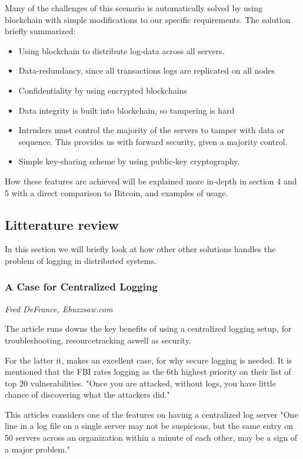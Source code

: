 Many of the challenges of this scenario is automatically solved by using blockchain with simple modifications to our specific requirements.
The solution briefly summarized:
\begin{itemize}
    \item Using blockchain to distribute log-data across all servers.
    \item Data-redundancy, since all transactions logs are replicated on all nodes
    \item Confidentiality by using encrypted blockchains
    \item Data integrity is built into blockchain, so tampering is hard
    \item Intruders must control the majority of the servers to tamper with data or sequence. This provides us with forward security, given a majority control.
    \item Simple key-sharing scheme by using public-key cryptography.
\end{itemize}

How these features are achieved will be explained more in-depth in section 4 and 5 with a direct comparison to Bitcoin, and examples of usage.

\subsection{Litterature review}
In this section we will briefly look at how other other solutions handles the problem of logging in distributed systems.
\subsubsection{A Case for Centralized Logging }
\vspace{-3mm}
{\footnotesize \it Fred DeFrance, Ebuzzsaw.com}~\cite{defrance}

The article runs downs the key benefits of using a centralized logging
setup, for troubleshooting, resourcetracking aswell as security.

For the latter it, makes an excellent case, for why secure logging is
needed. It is mentioned that the FBI rates logging as the 6th highest
priority on their list of top 20 vulnerabilities. "Once you are
attacked, without logs, you have little chance of discovering what the
attackers did."~\cite{defrance}

This articles considers one of the features on having a centralized
log server "One line in a log file on a single server may not be
suspicious, but the same entry on 50 servers across an organization
within a minute of each other, may be a sign of a major
problem."~\cite{defrance}

